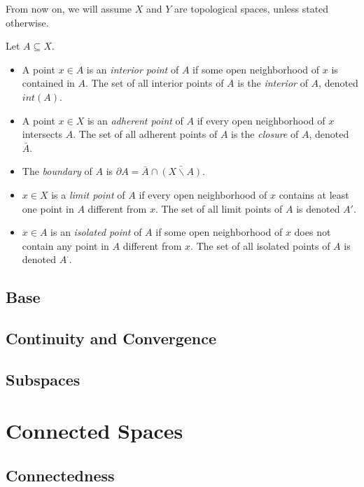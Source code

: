     From now on, we will assume $X$ and $Y$ are topological spaces, unless stated otherwise.
    
    \begin{defn} \label{def_topology_points}
        Let $A \subseteq X$. \begin{itemize}
            \item A point $x \in A$ is an \emph{interior point} of $A$ if some open neighborhood of $x$ is contained in $A$. The set of all interior points of $A$ is the \emph{interior} of $A$, denoted $int(A)$.
            \item A point $x \in X$ is an \emph{adherent point} of $A$ if every open neighborhood of $x$ intersects $A$. The set of all adherent points of $A$ is the \emph{closure} of $A$, denoted $\bar{A}$.
            \item The \emph{boundary} of $A$ is $\partial A = \bar{A} \cap \bar{(X \backslash A)}$.
            \item $x \in X$ is a \emph{limit point} of $A$ if every open neighborhood of $x$ contains at least one point in $A$ different from $x$. The set of all limit points of $A$ is denoted $A'$.
            \item $x \in A$ is an \emph{isolated point} of $A$ if some open neighborhood of $x$ does not contain any point in $A$ different from $x$. The set of all isolated points of $A$ is denoted $A^\cdot$.
    \end{itemize} \end{defn}
    
    \subsection{Base}
    
    \subsection{Continuity and Convergence}
    
    \subsection{Subspaces}
    
    \section{Connected Spaces}
    
    \subsection{Connectedness}
    
